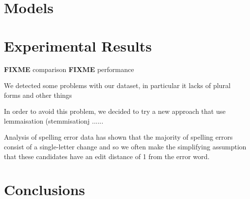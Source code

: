 \chapter{Models}



\chapter{Experimental Results} 
\textbf{FIXME} comparison
\textbf{FIXME} performance

We detected some problems with our dataset, in particular it lacks of plural forms and other things

In order to avoid this problem, we decided to try a new approach that use lemmaisation (stemmisationj ......



Analysis of spelling error data has shown that the majority of spelling errors consist of a single-letter change and so we 
often make the simplifying assumption that these candidates have an edit distance of 1 from the error word.



\chapter{Conclusions}
